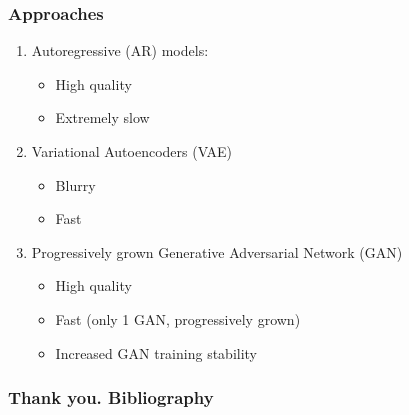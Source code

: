 \documentclass[xcolor=dvipsnames]{beamer}
\begin{document}
\begin{frame}
\frametitle{Approaches}
\begin{enumerate}
	\item Autoregressive (AR) models:
		\begin{itemize}
			\item High quality
			\item Extremely slow
		\end{itemize}
	\item Variational Autoencoders (VAE)
		\begin{itemize}
			\item Blurry
			\item Fast
		\end{itemize}
	\item Progressively grown Generative Adversarial Network (GAN)
		\begin{itemize}
			\item High quality
			\item Fast (only 1 GAN, progressively grown)
			\item Increased GAN training stability
		\end{itemize}
\end{enumerate}
\end{frame}






\begin{frame}
\frametitle{Thank you. Bibliography}


\end{frame}
\end{document}
